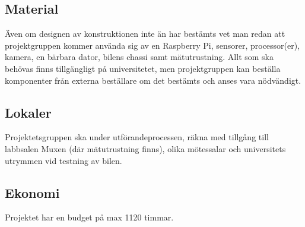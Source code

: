 \documentclass[projektplan/plan.tex]{subfiles}
\begin{document}
\subsection{Material}
Även om designen av konstruktionen inte än har bestämts vet man redan att
projektgruppen kommer använda sig av en Raspberry Pi, sensorer, processor(er),
kamera, en bärbara dator, bilens chassi samt mätutrustning. Allt som ska
behövas finns tillgängligt  på universitetet, men projektgruppen kan beställa
komponenter från externa beställare om det bestämts och anses vara nödvändigt.

\subsection{Lokaler}
Projektetsgruppen ska under utförandeprocessen, räkna med tillgång till
labbsalen Muxen (där mätutrustning finns), olika mötessalar och universitets
utrymmen vid testning av bilen.

\subsection{Ekonomi}
Projektet har en budget på max 1120 timmar.
\end{document}
